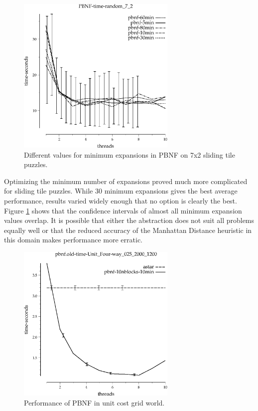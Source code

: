 \documentclass{article}
\begin{document}
\begin{figure}[h!]
\includegraphics[width=3in]{../graphs/tiles_random_7_2/PBNF-time-random_7_2.eps}
\caption{Different values for minimum expansions in PBNF on 7x2 sliding tile puzzles.}
\label{fig:PBNF-min-tile}
\end{figure}

Optimizing the minimum number of expansions proved much more complicated for sliding tile puzzles. While 30 minimum expansions gives the best average performance, results varied widely enough that no option is clearly the best. Figure \ref{fig:PBNF-min-tile} shows that the confidence intervals of almost all minimum expansion values overlap. It is possible that either the abstraction does not suit all problems equally well or that the reduced accuracy of the Manhattan Distance heuristic in this domain makes performance more erratic.

\begin{figure}[h!]
\includegraphics[width=3in]{../graphs/seth/grid-unit-single/PBNF.eps}
\caption{Performance of PBNF in unit cost grid world.}
\label{fig:PBNF-grid}
\end{figure}
\end{document}
